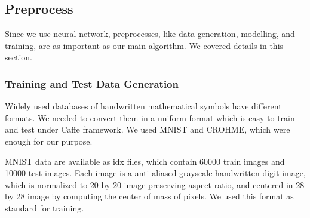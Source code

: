 \documentclass[10pt,twocolumn,letterpaper]{article}
\begin{document}
%
%
%
%
%
%


\subsection{Preprocess}

Since we use neural network, preprocesses, like data generation, modelling, and training, are as important as our main algorithm.
We covered details in this section.

\subsubsection{Training and Test Data Generation}

Widely used databases of handwritten mathematical symbols have different formats.
We needed to convert them in a uniform format which is easy to train and test under Caffe framework.
We used MNIST and CROHME, which were enough for our purpose.

MNIST data are available as idx files, which contain 60000 train images and 10000 test images.
Each image is a anti-aliased grayscale handwritten digit image, which is normalized to 20 by 20 image preserving aspect ratio, and centered in 28 by 28 image by computing the center of mass of pixels.
We used this format as standard for training.
\end{document}
